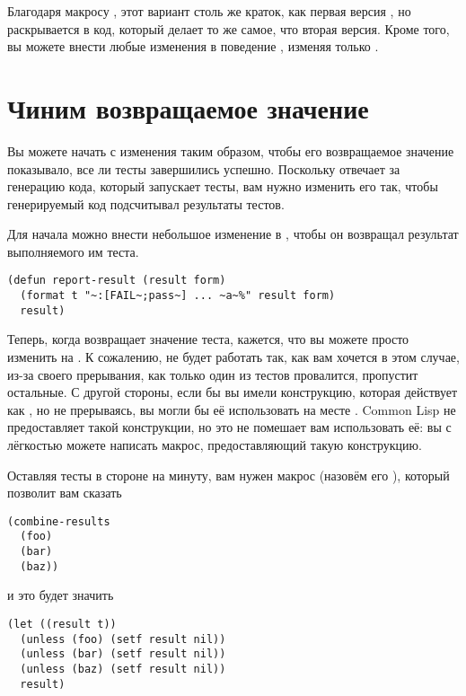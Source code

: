 Благодаря макросу , этот вариант столь же краток, как первая версия
, но раскрывается в код, который делает то же самое, что вторая версия. Кроме
того, вы можете внести любые изменения в поведение , изменяя только
.

\section{Чиним возвращаемое значение}

Вы можете начать с изменения  таким образом, чтобы его возвращаемое значение
показывало, все ли тесты завершились успешно. Поскольку  отвечает за генерацию
кода, который запускает тесты, вам нужно изменить его так, чтобы генерируемый код
подсчитывал результаты тестов.

Для начала можно внести небольшое изменение в , чтобы он возвращал
результат выполняемого им теста.

\begin{lstlisting}
(defun report-result (result form)
  (format t "~:[FAIL~;pass~] ... ~a~%" result form)
  result)
\end{lstlisting}

Теперь, когда  возвращает значение теста, кажется, что вы можете
просто изменить  на . К сожалению,  не будет работать так,
как вам хочется в этом случае, из-за своего прерывания, как только один из тестов
провалится,  пропустит остальные. С другой стороны, если бы вы имели
конструкцию, которая действует как , но не прерываясь, вы могли бы её
использовать на месте . Common Lisp не предоставляет такой конструкции, но это
не помешает вам использовать её: вы с лёгкостью можете написать макрос, предоставляющий
такую конструкцию.

Оставляя тесты в стороне на минуту, вам нужен макрос (назовём его ),
который позволит вам сказать

\begin{lstlisting}
(combine-results
  (foo)
  (bar)
  (baz))
\end{lstlisting}

и это будет значить

\begin{lstlisting}
(let ((result t))
  (unless (foo) (setf result nil))
  (unless (bar) (setf result nil))
  (unless (baz) (setf result nil))
  result)
\end{lstlisting}

